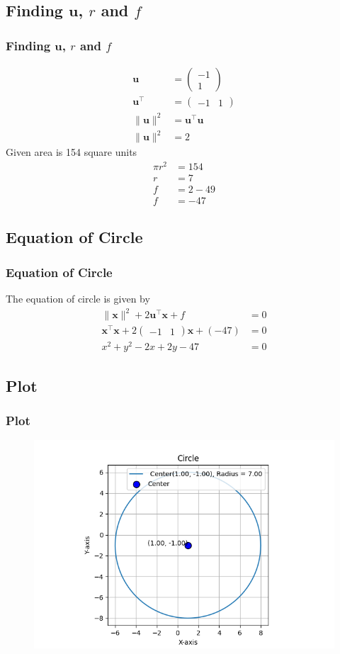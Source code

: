 \documentclass{beamer}
\theoremstyle{remark}
\newcommand{\myvec}[1]{\ensuremath{\begin{pmatrix}#1\end{pmatrix}}}
\let\vec\mathbf
\numberwithin{equation}{section}
\begin{document}
\subsection{Finding $\vec{u}$, $r$ and $f$}
\begin{frame}
\frametitle{Finding $\vec{u}$, $r$ and $f$}
\begin{align}
    \vec{u} & = \myvec{-1 \\ 1} \\
    \vec{u}^\intercal & = \myvec{-1 & 1} \\
    \lVert\vec{u}\rVert^2 & = \vec{u}^\intercal \vec{u} \\
    \lVert\vec{u}\rVert^2 & = 2
    \end{align}
    Given area is 154 square units
\begin{align}
    \pi r^2 & = 154 \\
    r & = 7 \\
    f & = 2 - 49 \\
    f & = -47
\end{align}
\end{frame}
\subsection{Equation of Circle}
\begin{frame}
\frametitle{Equation of Circle}
The equation of circle is given by
\begin{align}
    \lVert\vec{x}\rVert^2 + 2\vec{u}^\intercal\vec{x} + f & = 0 \\
    \vec{x}^\intercal\vec{x} + 2\myvec{-1 & 1}\vec{x} + (-47) & = 0 \\
    x^2 + y^2 - 2x + 2y - 47 & = 0 \label{eq:circ_eq}
\end{align}
\end{frame}
\subsection{Plot}
\begin{frame}
    \frametitle{Plot}
\begin{figure}[h!]
   \centering
   \includegraphics[width=0.9\linewidth]{figs/circle.png}
   \end{figure}
\end{frame}
\end{document}
